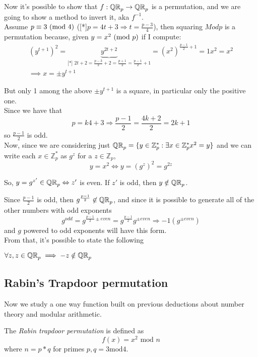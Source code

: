 Now it's possible to show that $f: \QR[p]\to \QR[p] $ is a permutation, and we
are going to show a method to invert it, aka $f^{-1}$.\\

Assume $p\equiv 3 \Mod{4}$
([*]$p=4t+3\Rightarrow t=\frac{p-3}{4}$), then squaring $Mod{p}$ is a permutation because, given
\underline{$y=x^2 \Mod{p}$} if I compute: \begin{gather*}
    (y^{t+1})^2=\underbrace{y^{2t+2}}_{\text{[*]
    }2t+2=\frac{p-3}{2}+2=\frac{p+1}{2}=\frac{p-1}{2}+1}=(x^2)^{\frac{p-1}{2}+1}=1x^2=x^2\\
    \implies x=\pm y^{t+1} \end{gather*}

But only 1 among the above $\pm y^{t+1}$ is a square, in particular only the
positive one.\\
Since we have that 
\[ 
    p=k4+3 \Rightarrow \frac{p-1}{2}=\frac{4k+2}{2}=2k+1
\]
so $\frac{p-1}{2}$ is odd.\\

Now, since we are considering just $\QR[p]=\{y \in \mathbb{Z}_{p}^{*} : \exists
x \in \mathbb{Z}_{p}^{*} x^{2}=y\}$ and we can write each $x \in
\mathbb{Z}_{p}^{*} $ as
$g^{z}$ for a $z \in \mathbb{Z}_{p}$, 
\[
    y=x^{2} \Leftrightarrow y=(g^{z})^{2}=g^{2z}
\]

So, $y=g^{z'} \in \QR[p] \Leftrightarrow z'$ is even. If $z'$ is odd, then $y \notin \QR[p] $.

Since $\frac{p-1}{2}$ is odd, then $g^{\frac{p-1}{2}} \not\in \QR[p]$, and since
it is possible to generate all of the other numbers with odd exponents 
\[
g^{odd}=g^{\frac{p-1}{2} \pm even}=g^{\frac{p-1}{2}}g^{ \pm even} \Rightarrow
-1(g^{\pm even})
\]
and $g$ powered to odd exponents will have this form.\\

From that, it's possible to state the following
\begin{lemma}
    $\forall z, z\in \QR[p] \implies  -z \notin \QR[p]$
\end{lemma}



\subsection{Rabin's Trapdoor permutation}

Now we study a one way function built on previous deductions about number theory and modular arithmetic.

The \textit{Rabin trapdoor permutation} is defined as 
\[
    f(x)=x^{2} \text{ mod } n
\]
where $n=p*q$ for primes $p,q=3 \text{mod} 4$.\\

